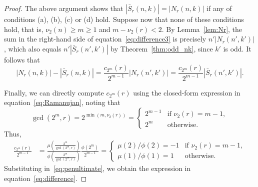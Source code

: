 \documentclass[12pt]{article}
\newcommand{\card}[1]{\left|#1\right|}
\newcommand{\bS}{\bar{S}}
\theoremstyle{definition}
\begin{document}
\begin{proof}
    The above argument shows that $\card{\bS_r(n, k)} = \card{N_r(n, k)}$ if any of conditions (a), (b), (c) or (d) hold.
    Suppose now that none of these conditions hold, that is, $\nu_2(n) \geq m\ge1$ and $m - \nu_2(r) < 2$. By Lemma~\ref{lem:Nr}, the sum in the right-hand side of equation~\eqref{eq:difference3} is precisely $n' \card{N_r(n', k')}$, which also equals
    $n' \card{\bS_r(n', k')}$ by Theorem~\ref{thm:odd_nk}, since $k'$ is odd. It follows that
    \begin{equation}
        \label{eq:penultimate}
        \card{N_r(n,k)}-\card{\bS_r(n,k)}=\frac{c_{2^m}(r)}{2^{m-1}} \card{N_r(n', k')}
        = \frac{c_{2^m}(r)}{2^{m-1}} \card{\bS_r(n', k')}.
    \end{equation}

    Finally, we can directly compute $c_{2^m}(r)$ using the closed-form expression in equation~\eqref{eq:Ramanujan}, noting that $$\gcd(2^m,r)=2^{\min(m,\nu_2(r))}=\begin{cases} 2^{m-1} & \text{if $\nu_2(r)=m-1$}, \\ 2^m & \text{otherwise}.
    \end{cases}$$
    Thus,
    \begin{align*}
        \frac{c_{2^m}(r)}{2^{m-1}} &= \frac{\mu \left( \frac{2^m}{\gcd(2^m, r)} \right) }{\phi \left( \frac{2^m}{\gcd(2^m, r)}\right)} \frac{\phi(2^m)}{2^{m-1}} = \begin{cases} \mu(2)/\phi(2) = -1 & \text{if $\nu_2(r)=m-1$}, \\ \mu(1)/\phi(1) = 1  & \text{otherwise}.
        \end{cases}
    \end{align*}
    Substituting in~\eqref{eq:penultimate}, we obtain the
    expression in equation~\eqref{eq:difference}.  
\end{proof}
\end{document}
